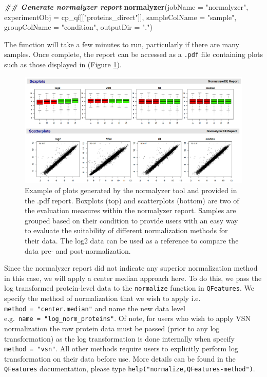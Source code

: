 \documentclass[9pt,a4paper,]{extarticle}
\newenvironment{Shaded}{\begin{snugshade}}{\end{snugshade}}
\newcommand{\AttributeTok}[1]{\textcolor[rgb]{0.13,0.29,0.53}{#1}}
\newcommand{\DocumentationTok}[1]{\textcolor[rgb]{0.56,0.35,0.01}{\textbf{\textit{#1}}}}
\newcommand{\FunctionTok}[1]{\textcolor[rgb]{0.13,0.29,0.53}{\textbf{#1}}}
\newcommand{\NormalTok}[1]{#1}
\newcommand{\StringTok}[1]{\textcolor[rgb]{0.31,0.60,0.02}{#1}}
\begin{document}
\begin{Shaded}
\begin{Highlighting}[]
\DocumentationTok{\#\# Generate normalyzer report}
\FunctionTok{normalyzer}\NormalTok{(}\AttributeTok{jobName =} \StringTok{"normalyzer"}\NormalTok{,}
           \AttributeTok{experimentObj =}\NormalTok{ cp\_qf[[}\StringTok{"proteins\_direct"}\NormalTok{]],}
           \AttributeTok{sampleColName =} \StringTok{"sample"}\NormalTok{,}
           \AttributeTok{groupColName =} \StringTok{"condition"}\NormalTok{,}
           \AttributeTok{outputDir =} \StringTok{"."}\NormalTok{)}
\end{Highlighting}
\end{Shaded}

The function will take a few minutes to run, particularly if there are many
samples. Once complete, the report can be accessed as a \texttt{.pdf} file containing
plots such as those displayed in (Figure \ref{fig:normalyzer-figure}).

\begin{figure}

{\centering \includegraphics[width=0.85\linewidth]{Images/normalyzerreport} 

}

\caption{Example of plots generated by the normalyzer tool and provided in the .pdf report. Boxplots (top) and scatterplots (bottom) are two of the evaluation measures within the normalyzer report. Samples are grouped based on their condition to provide users with an easy way to evaluate the suitability of different normalization methods for their data. The log2 data can be used as a reference to compare the data pre- and post-normalization.}\label{fig:normalyzer-figure}
\end{figure}

Since the normalyzer report did not indicate any superior normalization method
in this case, we will apply a center median approach here. To do this, we pass
the log transformed protein-level data to the \texttt{normalize} function in
\texttt{QFeatures}. We specify the method of normalization that we wish to apply i.e.
\texttt{method\ =\ "center.median"} and name the new data level e.g.~\texttt{name\ =\ "log\_norm\_proteins"}.
Of note, for users who wish to apply VSN normalization the raw protein data must
be passed (prior to any log transformation) as the log transformation is done
internally when specify \texttt{method\ =\ "vsn"}. All other methods require users to
explicitly perform log transformation on their data before use. More details
can be found in the \texttt{QFeatures} documentation, please type \texttt{help("normalize,QFeatures-method")}.
\end{document}
